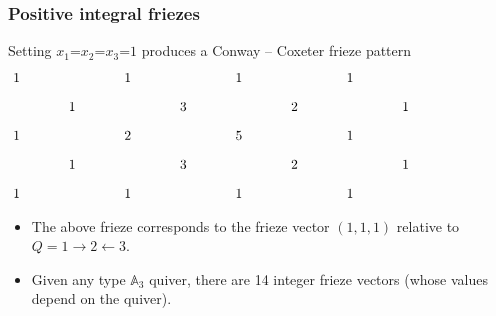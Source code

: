\documentclass{beamer}
\begin{document}
\newcommand{\zehn}{\hspace{10pt}}
\newcommand{\fuenf}{\hspace{5pt}}
\newcommand{\fuenfm}{\hspace{-5pt}}



\begin{frame}
\frametitle{Positive integral friezes}
\noindent 
Setting $x_1$=$x_2$=$x_3$=$1$ produces 
a Conway -- Coxeter frieze pattern 
\large
\[\xymatrix@R-15pt@C30pt{ 
1 &&
1 &&
1 &&
1 &&
\\
& 1  &&
3  &&
2  &&
1  &&
\\
1  &&
2  &&
5  &&
1  &&
 \\
&
1 &&
3 &&
2 &&
1 &&
\\
1 &&
1 &&
1 &&
1 &&
}
\] 
\begin{itemize}
\item
The above frieze corresponds to the frieze vector $(1,1,1)$ relative to $Q=1 \rightarrow 2 \leftarrow 3$. 

\item
Given any type $\mathbb{A}_3$ quiver, there are 14 integer frieze vectors (whose values depend on the quiver). 
\end{itemize}

\end{frame}
\end{document}
